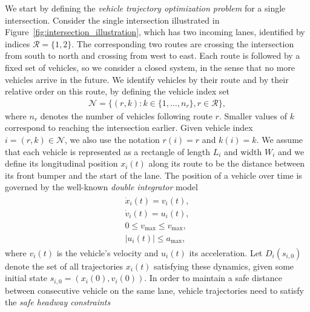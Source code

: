 \documentclass[a4paper]{article}
\theoremstyle{definition}
\theoremstyle{plain}
\begin{document}
We start by defining the \textit{vehicle trajectory optimization problem} for a
single intersection.
%
Consider the single intersection illustrated in
Figure~\ref{fig:intersection_illustration}, which has two incoming lanes,
identified by indices $\mathcal{R} = \{ 1, 2 \}$. The corresponding two routes
are crossing the intersection from south to north and crossing from west to
east.
%
Each route is followed by a fixed set of vehicles, so we consider a closed
system, in the sense that no more vehicles arrive in the future.
%
We identify vehicles by their route and by their relative order on this
route, by defining the vehicle index set
\begin{align}
  \mathcal{N} = \{ (r, k) : k \in \{1, \dots, n_{r}\}, r \in \mathcal{R}\} ,
\end{align}
where $n_{r}$ denotes the number of vehicles following route $r$. Smaller
values of $k$ correspond to reaching the intersection earlier. Given vehicle
index $i = (r, k) \in \mathcal{N}$, we also use the notation $r(i) = r$ and
$k(i) = k$.
%
We assume that each vehicle is represented as a rectangle of length $L_{i}$ and
width $W_{i}$ and we define its longitudinal position $x_{i}(t)$ along its route
to be the distance between its front bumper and the start of the lane. The
position of a vehicle over time is governed by the well-known \textit{double integrator}
model
\begin{gather}
  \label{eq:vehicle_dynamics}
\begin{aligned}
  \dot{x}_{i}(t) = v_{i}(t) , \\
  \dot{v}_{i}(t) = u_{i}(t)  , \\
  0 \leq v_{\max} \leq v_{\max} , \\
  |u_{i}(t) | \leq a_{\max} ,
\end{aligned}
\end{gather}
where $v_{i}(t)$ is the vehicle's velocity and $u_{i}(t)$ its acceleration. Let
$D_{i}(s_{i,0})$ denote the set of all trajectories $x_{i}(t)$ satisfying these
dynamics, given some initial state $s_{i,0} = (x_{i}(0), v_{i}(0))$.
%
In order to maintain a safe distance between consecutive vehicle on the same
lane, vehicle trajectories need to satisfy the \textit{safe headway constraints}
\end{document}

